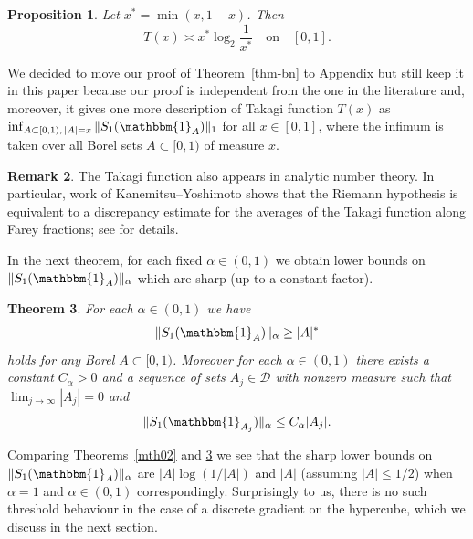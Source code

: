 \documentclass[11pt]{amsart}
\newtheorem{theorem}{Theorem}[section]
\newtheorem{proposition}[theorem]{Proposition}
\theoremstyle{definition}
\newtheorem{remark}[theorem]{Remark}
\renewcommand{\1}{{\mathbbm{1}}}
\begin{document}
\begin{proposition}\label{col:asympT}
Let $x^*=\min(x,1-x)$. Then
$$
T(x)\asymp x^*\log_2\frac1{x^*} \quad \text{on} \quad [0,1].
$$
\end{proposition}

We decided to move our proof of Theorem~\ref{thm-bn} to Appendix but still keep it in this paper because our proof is independent from the one in the literature and, moreover,  it gives one more description of  Takagi function $T(x)$ as $\inf_{A \subset {[0,1)},\, |A|=x} \| S_{1}(\mathbbm{1}_{A})\|_{1}$
for all $x \in [0,1]$, where the infimum is taken over all Borel sets $A\subset{[0,1)}$ of measure $x$. \\


\begin{remark}\label{rem:takagi-rh}
The Takagi function also appears in analytic number theory. In particular, work of Kanemitsu--Yoshimoto shows that the Riemann hypothesis is equivalent to a discrepancy estimate for the averages of the Takagi function along Farey fractions; see \cite{KYTakagiRH,LagariasTakagiRH} for details.
\end{remark}

In the next theorem, for each fixed $\alpha \in (0,1)$ we obtain lower bounds on $\| S_{1}(\mathbbm{1}_{A})\|_{\alpha}$ which are sharp (up to a constant factor). 

\begin{theorem}\label{mth03}
For each $\alpha \in (0,1)$ we have
\begin{align*}
\|S_{1}(\mathbbm{1}_{A})\|_{\alpha} \geq |A|^{*}
\end{align*}
holds for any Borel $A \subset {[0,1)}$. Moreover for each $\alpha\in (0,1)$ there exists a constant $C_{\alpha}>0$ and a sequence of sets $A_{j} \in \mathcal{D}$ with nonzero measure such that $\lim_{j \to \infty}|A_{j}|=0$ and
\[
\|S_{1}(\mathbbm{1}_{A_{j}})\|_{\alpha} \leq C_{\alpha} |A_{j}|.
\]
\end{theorem}

Comparing Theorems~\ref{mth02} and \ref{mth03} we see that the sharp lower bounds on $\| S_{1}(\mathbbm{1}_{A})\|_{\alpha}$ are $|A|\log(1/|A|)$ and $|A|$ (assuming $|A|\leq1/2$) when $\alpha =1$ and $\alpha \in (0,1)$ correspondingly. Surprisingly to us, there is no such threshold behaviour in the case of a discrete gradient on the hypercube, which we discuss in the next section.\\
\end{document}
